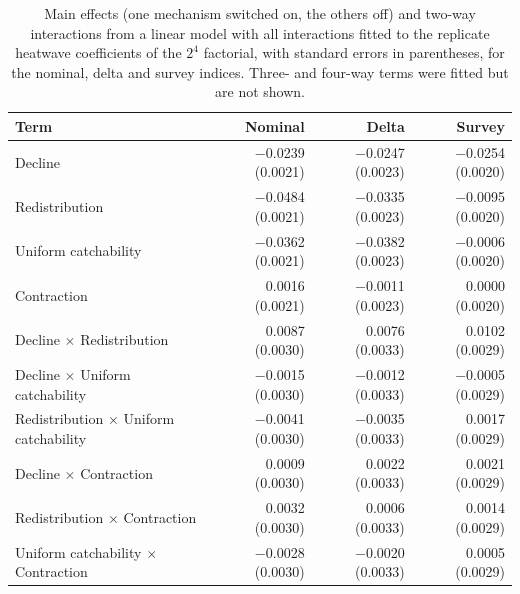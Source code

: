 \documentclass[11pt,a4paper]{article}
\begin{document}
\begin{table}[htbp]
\centering\footnotesize
\caption{Main effects (one mechanism switched on, the others off) and two-way interactions from a linear model with all interactions fitted to the replicate heatwave coefficients of the $2^4$ factorial, with standard errors in parentheses, for the nominal, delta and survey indices. Three- and four-way terms were fitted but are not shown.}
\label{tab:anova}
\begin{tabular}{@{}lrrr@{}}
\toprule
Term & Nominal & Delta & Survey \\
\midrule
Decline & $-$0.0239 (0.0021) & $-$0.0247 (0.0023) & $-$0.0254 (0.0020) \\
Redistribution & $-$0.0484 (0.0021) & $-$0.0335 (0.0023) & $-$0.0095 (0.0020) \\
Uniform catchability & $-$0.0362 (0.0021) & $-$0.0382 (0.0023) & $-$0.0006 (0.0020) \\
Contraction & 0.0016 (0.0021) & $-$0.0011 (0.0023) & 0.0000 (0.0020) \\
Decline $\times$ Redistribution & 0.0087 (0.0030) & 0.0076 (0.0033) & 0.0102 (0.0029) \\
Decline $\times$ Uniform catchability & $-$0.0015 (0.0030) & $-$0.0012 (0.0033) & $-$0.0005 (0.0029) \\
Redistribution $\times$ Uniform catchability & $-$0.0041 (0.0030) & $-$0.0035 (0.0033) & 0.0017 (0.0029) \\
Decline $\times$ Contraction & 0.0009 (0.0030) & 0.0022 (0.0033) & 0.0021 (0.0029) \\
Redistribution $\times$ Contraction & 0.0032 (0.0030) & 0.0006 (0.0033) & 0.0014 (0.0029) \\
Uniform catchability $\times$ Contraction & $-$0.0028 (0.0030) & $-$0.0020 (0.0033) & 0.0005 (0.0029) \\
\bottomrule
\end{tabular}
\end{table}
\end{document}
